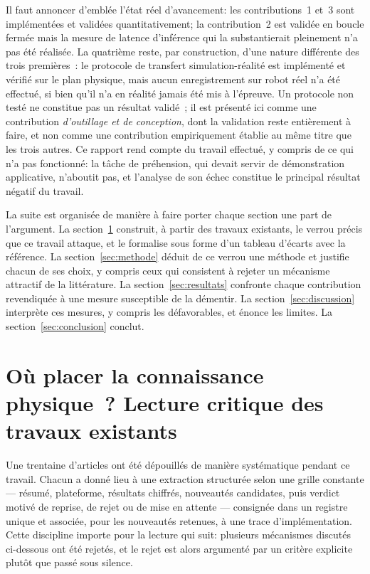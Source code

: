 \documentclass[a4paper, oneside]{article}
\begin{document}
Il faut annoncer d'emblée l'état réel d'avancement: les contributions~1 et~3
sont implémentées et validées quantitativement; la contribution~2 est validée
en boucle fermée mais la mesure de latence d'inférence qui la substantierait
pleinement n'a pas été réalisée. La quatrième reste, par construction, d'une
nature différente des trois premières~: le protocole de transfert
simulation-réalité est implémenté et vérifié sur le plan physique, mais aucun
enregistrement sur robot réel n'a été effectué, si bien qu'il n'a en réalité
jamais été mis à l'épreuve. Un protocole non testé ne constitue pas un
résultat validé~; il est présenté ici comme une contribution \emph{d'outillage
et de conception}, dont la validation reste entièrement à faire, et non comme
une contribution empiriquement établie au même titre que les trois autres. Ce
rapport rend compte du travail effectué, y compris de ce qui n'a pas
fonctionné: la tâche de préhension, qui devait servir de démonstration
applicative, n'aboutit pas, et l'analyse de son échec constitue le principal
résultat négatif du travail.

La suite est organisée de manière à faire porter chaque section une part de
l'argument. La section~\ref{sec:etat-art} construit, à partir des travaux
existants, le verrou précis que ce travail attaque, et le formalise sous forme
d'un tableau d'écarts avec la référence. La section~\ref{sec:methode} déduit de
ce verrou une méthode et justifie chacun de ses choix, y compris ceux qui
consistent à rejeter un mécanisme attractif de la littérature. La
section~\ref{sec:resultats} confronte chaque contribution revendiquée à une
mesure susceptible de la démentir. La section~\ref{sec:discussion} interprète
ces mesures, y compris les défavorables, et énonce les limites. La
section~\ref{sec:conclusion} conclut.

\section{Où placer la connaissance physique~? Lecture critique des
travaux existants}
\label{sec:etat-art}

Une trentaine d'articles ont été dépouillés de manière systématique pendant ce
travail. Chacun a donné lieu à une extraction structurée selon une grille
constante — résumé, plateforme, résultats chiffrés, nouveautés candidates,
puis verdict motivé de reprise, de rejet ou de mise en attente — consignée dans
un registre unique et associée, pour les nouveautés retenues, à une trace
d'implémentation. Cette discipline importe pour la lecture qui suit: plusieurs
mécanismes discutés ci-dessous ont été rejetés, et le rejet est alors argumenté
par un critère explicite plutôt que passé sous silence.
\end{document}
